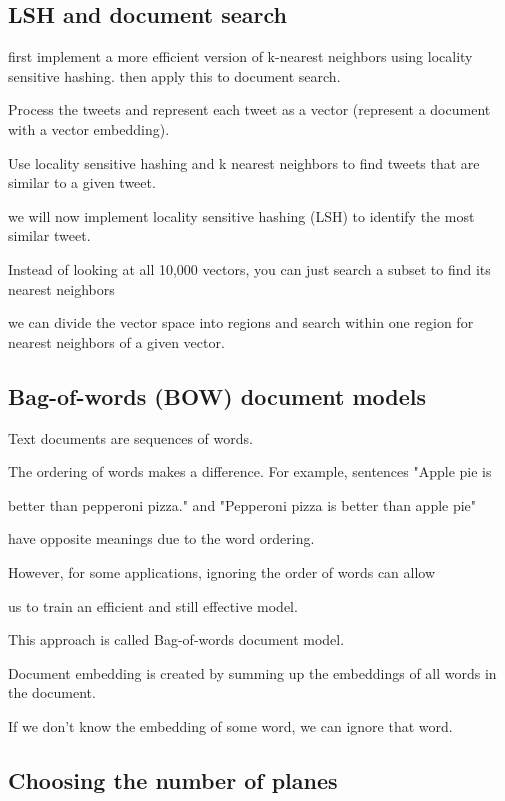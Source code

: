 \documentclass[4apaper,12pt]{book}
\begin{document}
\begin{description}
  \subsection{LSH and document search}
\item first implement a more efficient version of k-nearest neighbors using locality sensitive hashing.  then apply this to document search.

\item Process the tweets and represent each tweet as a vector (represent a document with a vector embedding).
\item Use locality sensitive hashing and k nearest neighbors to find tweets that are similar to a given tweet.
\item we will now implement locality sensitive hashing (LSH) to identify the most similar tweet.
\item Instead of looking at all 10,000 vectors, you can just search a subset to find its nearest neighbors
\item we can divide the vector space into regions and search within one region for nearest neighbors of a given vector.

\subsection{Bag-of-words (BOW) document models}
\item Text documents are sequences of words.
\item The ordering of words makes a difference. For example, sentences "Apple pie is
\item better than pepperoni pizza." and "Pepperoni pizza is better than apple pie"
\item have opposite meanings due to the word ordering.
\item However, for some applications, ignoring the order of words can allow
\item us to train an efficient and still effective model.
\item This approach is called Bag-of-words document model.

\item Document embedding is created by summing up the embeddings of all words
in the document.
\item If we don't know the embedding of some word, we can ignore that word.

\subsection{ Choosing the number of planes}


\end{description}
\end{document}
